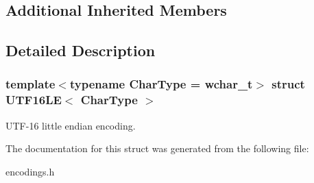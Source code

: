 \subsection*{Additional Inherited Members}


\subsection{Detailed Description}
\subsubsection*{template$<$typename Char\+Type = wchar\+\_\+t$>$\newline
struct U\+T\+F16\+L\+E$<$ Char\+Type $>$}

U\+T\+F-\/16 little endian encoding. 

The documentation for this struct was generated from the following file\+:\begin{DoxyCompactItemize}
\item 
encodings.\+h\end{DoxyCompactItemize}
